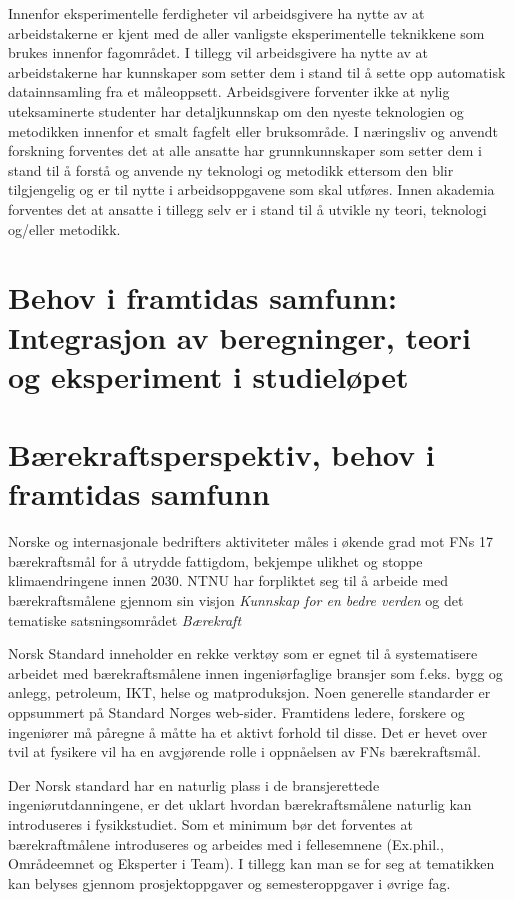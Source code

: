 \documentclass{article}
\begin{document}
Innenfor eksperimentelle ferdigheter vil arbeidsgivere ha nytte av at arbeidstakerne er kjent med de aller vanligste eksperimentelle teknikkene som brukes innenfor fagområdet.
I tillegg vil arbeidsgivere ha nytte av at arbeidstakerne har kunnskaper som setter dem i stand til å sette opp automatisk datainnsamling fra et måleoppsett.
Arbeidsgivere forventer ikke at nylig uteksaminerte studenter har detaljkunnskap om den nyeste teknologien og metodikken innenfor et smalt fagfelt eller bruksområde.
I næringsliv og anvendt forskning forventes det at alle ansatte har grunnkunnskaper som setter dem i stand til å forstå og anvende ny teknologi og metodikk ettersom den blir tilgjengelig og er til nytte i arbeidsoppgavene som skal utføres.
Innen akademia forventes det at ansatte i tillegg selv er i stand til å utvikle ny teori, teknologi og/eller metodikk.

\section{Behov i framtidas samfunn: Integrasjon av beregninger, teori og eksperiment i studieløpet}

\section{Bærekraftsperspektiv, behov i framtidas samfunn}
Norske og internasjonale bedrifters aktiviteter måles i økende grad mot FNs 17 bærekraftsmål for å utrydde fattigdom, bekjempe ulikhet og stoppe klimaendringene innen 2030\cite{FNsustgoals}.
NTNU har forpliktet seg til å arbeide med bærekraftsmålene gjennom sin visjon \emph{Kunnskap for en bedre verden} og det tematiske satsningsområdet \emph{Bærekraft} \cite{NTNUStrategi,NTNUBaerekraftMaal,NTNUBaerekraft}

Norsk Standard inneholder en rekke verktøy som er egnet til å systematisere arbeidet med bærekraftsmålene innen ingeniørfaglige bransjer som f.eks. bygg og anlegg, petroleum, IKT, helse og matproduksjon.
Noen generelle standarder er oppsummert på Standard Norges web-sider\cite{StandardNorge}.
Framtidens ledere, forskere og ingeniører må påregne å måtte ha et aktivt forhold til disse.
Det er hevet over tvil at fysikere vil ha en avgjørende rolle i oppnåelsen av FNs bærekraftsmål.

Der Norsk standard har en naturlig plass i de bransjerettede ingeniørutdanningene, er det uklart hvordan bærekraftsmålene naturlig kan introduseres i fysikkstudiet.
Som et minimum bør det forventes at bærekraftmålene introduseres og arbeides med i fellesemnene (Ex.phil., Områdeemnet og Eksperter i Team)\cite{NTNUFellesEmner}.
I tillegg kan man se for seg at tematikken kan belyses gjennom prosjektoppgaver og semesteroppgaver i øvrige fag.
\end{document}

